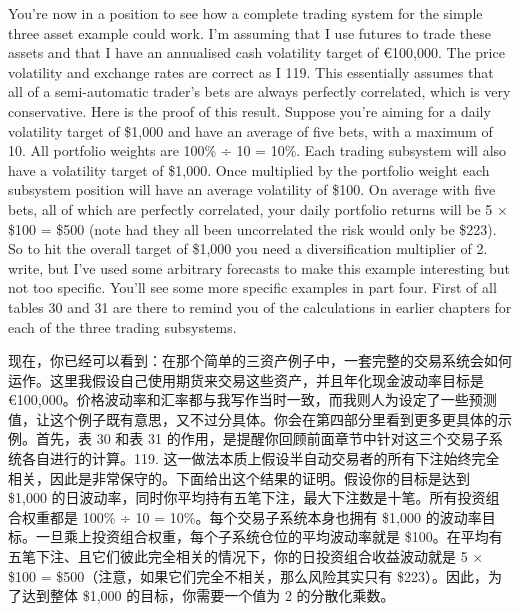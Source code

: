 \begin{englishblock} You're now in a position to see how a complete trading system for the simple three asset example could work. I'm assuming that I use futures to trade these assets and that I have an annualised cash volatility target of €100,000. The price volatility and exchange rates are correct as I 119. This essentially assumes that all of a semi-automatic trader's bets are always perfectly correlated, which is very conservative. Here is the proof of this result. Suppose you're aiming for a daily volatility target of \$1,000 and have an average of five bets, with a maximum of 10. All portfolio weights are 100\% ÷ 10 = 10\%. Each trading subsystem will also have a volatility target of \$1,000. Once multiplied by the portfolio weight each subsystem position will have an average volatility of \$100. On average with five bets, all of which are perfectly correlated, your daily portfolio returns will be 5 × \$100 = \$500 (note had they all been uncorrelated the risk would only be \$223). So to hit the overall target of \$1,000 you need a diversification multiplier of 2. write, but I've used some arbitrary forecasts to make this example interesting but not too specific. You'll see some more specific examples in part four. First of all tables 30 and 31 are there to remind you of the calculations in earlier chapters for each of the three trading subsystems. \end{englishblock}

\begin{chineseblock}现在，你已经可以看到：在那个简单的三资产例子中，一套完整的交易系统会如何运作。这里我假设自己使用期货来交易这些资产，并且年化现金波动率目标是 €100,000。价格波动率和汇率都与我写作当时一致，而我则人为设定了一些预测值，让这个例子既有意思，又不过分具体。你会在第四部分里看到更多更具体的示例。首先，表 30 和表 31 的作用，是提醒你回顾前面章节中针对这三个交易子系统各自进行的计算。119. 这一做法本质上假设半自动交易者的所有下注始终完全相关，因此是非常保守的。下面给出这个结果的证明。假设你的目标是达到 \$1,000 的日波动率，同时你平均持有五笔下注，最大下注数是十笔。所有投资组合权重都是 100\% ÷ 10 = 10\%。每个交易子系统本身也拥有 \$1,000 的波动率目标。一旦乘上投资组合权重，每个子系统仓位的平均波动率就是 \$100。在平均有五笔下注、且它们彼此完全相关的情况下，你的日投资组合收益波动就是 5 × \$100 = \$500（注意，如果它们完全不相关，那么风险其实只有 \$223）。因此，为了达到整体 \$1,000 的目标，你需要一个值为 2 的分散化乘数。\end{chineseblock}

